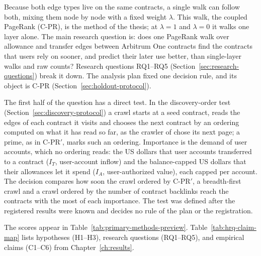 Because both edge types live on the same contracts, a single walk can follow both, mixing them node by node with a fixed weight $\lambda$. This walk, the coupled PageRank (\mbox{C-PR}), is the method of the thesis; at $\lambda=1$ and $\lambda=0$ it walks one layer alone. The main research question is: does one PageRank walk over allowance and transfer edges between Arbitrum One contracts find the contracts that users rely on sooner, and predict their later use better, than single-layer walks and raw counts? Research questions RQ1--RQ5 (Section~\ref{sec:research-questions}) break it down. The analysis plan fixed one decision rule, and its object is \mbox{C-PR} (Section~\ref{sec:holdout-protocol}).

The first half of the question has a direct test. In the discovery-order test (Section~\ref{sec:discovery-protocol}) a crawl starts at a seed contract, reads the edges of each contract it visits and chooses the next contract by an ordering computed on what it has read so far, as the crawler of \textcite{cho1998crawling} chose its next page; a prime, as in \mbox{C-PR}$'$, marks such an ordering. Importance is the demand of user accounts, which no ordering reads: the US dollars that user accounts transferred to a contract ($I_T$, user-account inflow) and the balance-capped US dollars that their allowances let it spend ($I_A$, user-authorized value), each capped per account. The decision compares how soon the crawl ordered by \mbox{C-PR}$'$, a breadth-first crawl and a crawl ordered by the number of contract backlinks reach the contracts with the most of each importance. The test was defined after the registered results were known and decides no rule of the plan or the registration.

The scores appear in Table~\ref{tab:primary-methods-preview}. Table~\ref{tab:hrq-claim-map} lists hypotheses (H1--H3), research questions (RQ1--RQ5), and empirical claims (C1--C6) from Chapter~\ref{ch:results}.

